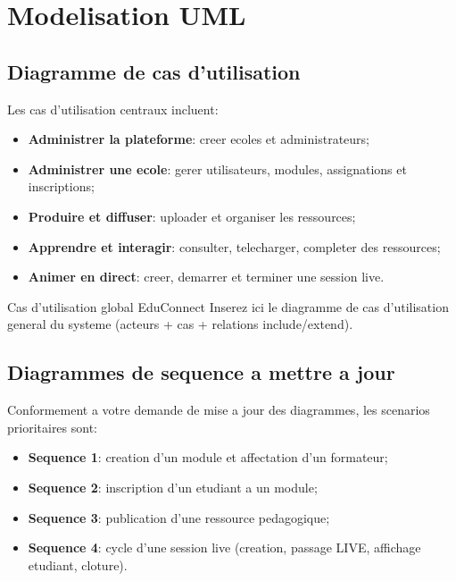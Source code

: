 ﻿\documentclass[12pt,a4paper,oneside]{report}
\begin{document}
\section{Modelisation UML}

\subsection{Diagramme de cas d'utilisation}

Les cas d'utilisation centraux incluent:
\begin{itemize}
  \item \textbf{Administrer la plateforme}: creer ecoles et administrateurs;
  \item \textbf{Administrer une ecole}: gerer utilisateurs, modules, assignations et inscriptions;
  \item \textbf{Produire et diffuser}: uploader et organiser les ressources;
  \item \textbf{Apprendre et interagir}: consulter, telecharger, completer des ressources;
  \item \textbf{Animer en direct}: creer, demarrer et terminer une session live.
\end{itemize}

\begin{figurebox}{Cas d'utilisation global EduConnect}
Inserez ici le diagramme de cas d'utilisation general du systeme (acteurs + cas + relations include/extend).
\end{figurebox}

\subsection{Diagrammes de sequence a mettre a jour}

Conformement a votre demande de mise a jour des diagrammes, les scenarios prioritaires sont:
\begin{itemize}
  \item \textbf{Sequence 1}: creation d'un module et affectation d'un formateur;
  \item \textbf{Sequence 2}: inscription d'un etudiant a un module;
  \item \textbf{Sequence 3}: publication d'une ressource pedagogique;
  \item \textbf{Sequence 4}: cycle d'une session live (creation, passage LIVE, affichage etudiant, cloture).
\end{itemize}
\end{document}
